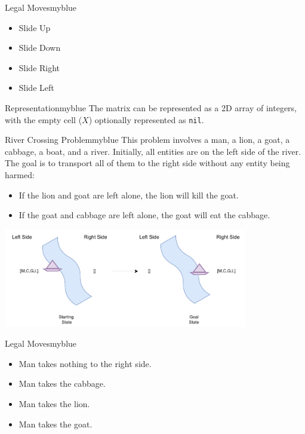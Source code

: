 \begin{prettyBox}{Legal Moves}{myblue}
\begin{itemize}
    \item Slide Up
    \item Slide Down
    \item Slide Right
    \item Slide Left
\end{itemize}
\end{prettyBox}

\vspace{0.45cm}

\begin{prettyBox}{Representation}{myblue}
The matrix can be represented as a 2D array of integers, with the empty cell (\(X\)) optionally represented as \texttt{nil}.
\end{prettyBox}


\vspace{0.35cm}


\begin{prettyBox}{River Crossing Problem}{myblue}
This problem involves a man, a lion, a goat, a cabbage, a boat, and a river. Initially, all entities are on the left side of the river. The goal is to transport all of them to the right side without any entity being harmed:
\begin{itemize}
    \item If the lion and goat are left alone, the lion will kill the goat.
    \item If the goat and cabbage are left alone, the goat will eat the cabbage.
\end{itemize}
\end{prettyBox}


\vspace{0.5cm}
\begin{center}
    \includegraphics[width=0.8\textwidth]{Chapters/Example/Uninformed/ex2.1.drawio.pdf}
\end{center}

\vspace{0.5cm}
\begin{prettyBox}{Legal Moves}{myblue}
\begin{itemize}
    \item Man takes nothing to the right side.
    \item Man takes the cabbage.
    \item Man takes the lion.
    \item Man takes the goat.
\end{itemize}
\end{prettyBox}

